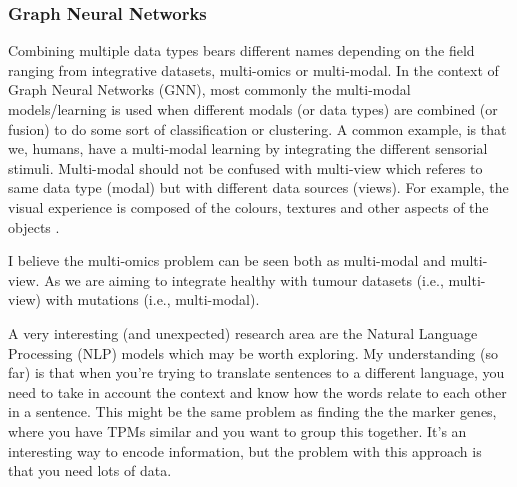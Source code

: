\subsubsection{Graph Neural Networks}

Combining multiple data types bears different names depending on the field ranging from integrative datasets, multi-omics or multi-modal. In the context of Graph Neural Networks (GNN), most commonly the multi-modal models/learning is used when different modals (or data types) are combined (or fusion) to do some sort of classification or clustering. A common example, is that we, humans, have a multi-modal learning by integrating the different sensorial stimuli. Multi-modal should not be confused with multi-view which referes to same data type (modal) but with different data sources (views). For example, the visual experience is composed of the colours, textures and other aspects of the objects \cite{Eman_Alshari_undated-vv}.

I believe the multi-omics problem can be seen both as multi-modal and multi-view. As we are aiming to integrate healthy with tumour datasets (i.e., multi-view) with mutations (i.e., multi-modal).

A very interesting (and unexpected) research area are the Natural Language Processing (NLP) models which may be worth exploring. My understanding (so far) is that when you're trying to translate sentences to a different language, you need to take in account the context and know how the words relate to each other in a sentence. This might be the same problem as finding the the marker genes, where you have TPMs similar and you want to group this together. It's an interesting way to encode information, but the problem with this approach is that you need lots of data.